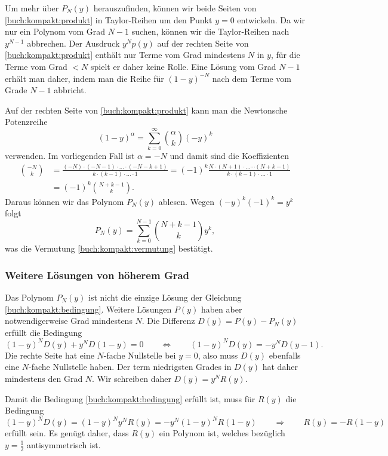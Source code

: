 Um mehr über $P_N(y)$ herauszufinden, können wir beide Seiten von
\eqref{buch:kompakt:produkt} in Taylor-Reihen um den Punkt $y=0$
entwickeln.
Da wir nur ein Polynom vom Grad $N-1$ suchen, können wir die Taylor-Reihen
nach $y^{N-1}$ abbrechen.
Der Ausdruck $y^Np(y)$ auf der rechten Seite von \eqref{buch:kompakt:produkt}
enthält nur Terme vom Grad mindestens $N$ in $y$,
für die Terme vom Grad $<N$ spielt er daher keine Rolle.
Eine Lösung vom Grad $N-1$ erhält man daher, indem man die Reihe
für $(1-y)^{-N}$ nach dem Terme vom Grade $N-1$ abbricht.

Auf der rechten Seite von \eqref{buch:kompakt:produkt}
kann man die Newtonsche Potenzreihe
\begin{equation*}
(1-y)^{\alpha} = \sum_{k=0}^{\infty} \binom{\alpha}{k} (-y)^k
\end{equation*}
verwenden.
Im vorliegenden Fall ist $\alpha=-N$ und damit sind die Koeffizienten
\begin{align*}
\binom{-N}{k}
&=
\frac{(-N)\cdot(-N-1)\cdot\dots\cdot (-N-k+1)}{k\cdot (k-1)\cdot\dots\cdot 1}
=
(-1)^k \frac{N\cdot(N+1)\cdot\dots\cdots (N+k-1)}{k\cdot(k-1)\cdot\dots\cdot 1}
\\
&=
(-1)^k \binom{N+k-1}{k}.
\end{align*}
Daraus können wir das Polynom $P_N(y)$ ablesen.
Wegen $(-y)^k(-1)^k=y^k$ folgt
\begin{equation}
P_N(y) = \sum_{k=0}^{N-1} \binom{N+k-1}{k}y^k,
\end{equation}
was die Vermutung \eqref{buch:kompakt:vermutung} bestätigt.

\subsubsection{Weitere Lösungen von höherem Grad}
Das Polynom $P_N(y)$ ist nicht die einzige Lösung der Gleichung
\eqref{buch:kompakt:bedingung}.
Weitere Lösungen $P(y)$ haben aber notwendigerweise Grad mindestens $N$.
Die Differenz $D(y) = P(y)-P_N(y)$ erfüllt die Bedingung
\[
(1-y)^N D(y) + y^N D(1-y) = 0
\qquad\Leftrightarrow\qquad
(1-y)^N D(y) = -y^N D(y-1).
\]
Die rechte Seite hat eine $N$-fache Nullstelle bei $y=0$, also muss
$D(y)$ ebenfalls eine $N$-fache Nullstelle haben. 
Der term niedrigsten Grades in $D(y)$ hat daher mindestens den Grad $N$.
Wir schreiben daher $D(y) = y^NR(y)$.

Damit die Bedingung \eqref{buch:kompakt:bedingung} erfüllt ist, muss
für $R(y)$ die Bedingung
\[
(1-y)^N
D(y)
=
(1-y)^N
y^N
R(y)
=
-y^N
(1-y)^N
R(1-y)
\qquad\Rightarrow\qquad
R(y) = -R(1-y)
\]
erfüllt sein.
Es genügt daher, dass $R(y)$ ein Polynom ist, welches bezüglich $y=\frac12$
antisymmetrisch ist.





